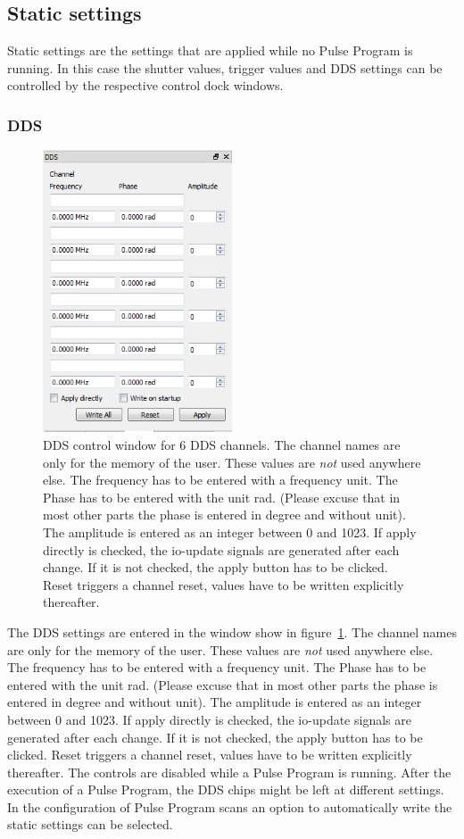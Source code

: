 \documentclass[11pt]{scrartcl}
\begin{document}
\subsection{Static settings}
Static settings are the settings that are applied while no Pulse Program is running. In this case the shutter values, trigger values and DDS settings can be controlled by the respective control dock windows.

\subsubsection{DDS}
\begin{figure}
\centering
\includegraphics[width=0.5\textwidth]{DDS}
\caption{\label{DDS} DDS control window for 6 DDS channels. The channel names are only for the memory of the user. These values are {\em not} used anywhere else. The frequency has to be entered with a frequency unit. The Phase has to be entered with the unit rad. (Please excuse that in most other parts the phase is entered in degree and without unit). The amplitude is entered as an integer between 0 and 1023. If apply directly is checked, the io-update signals are generated after each change. If it is not checked, the apply button has to be clicked. Reset triggers a channel reset, values have to be written explicitly thereafter. }
\end{figure}
The DDS settings are entered in the window show in figure~\ref{DDS}.  The channel names are only for the memory of the user. These values are {\em not} used anywhere else. The frequency has to be entered with a frequency unit. The Phase has to be entered with the unit rad. (Please excuse that in most other parts the phase is entered in degree and without unit). The amplitude is entered as an integer between 0 and 1023. If apply directly is checked, the io-update signals are generated after each change. If it is not checked, the apply button has to be clicked. Reset triggers a channel reset, values have to be written explicitly thereafter. The controls are disabled while a Pulse Program is running. After the execution of a Pulse Program, the DDS chips might be left at different settings. In the configuration of Pulse Program scans an option to automatically write the static settings can be selected.
\end{document}
